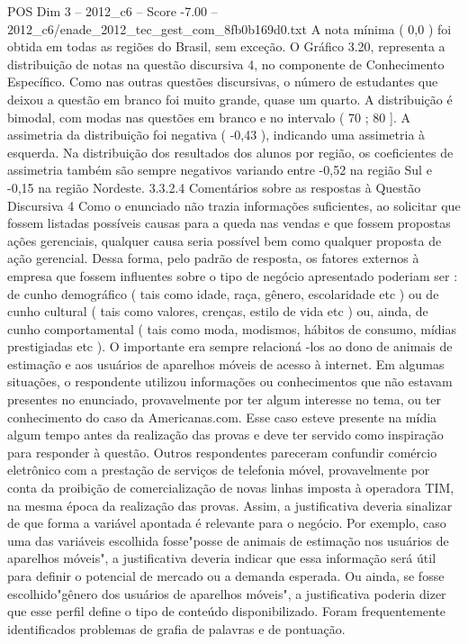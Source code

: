 \begin{textsample}{POS Dim 3 – 2012\_c6 – Score -7.00 – 2012\_c6/enade\_2012\_tec\_gest\_com\_8fb0b169d0.txt}
A nota mínima ( 0,0 ) foi obtida em todas as regiões do Brasil, sem exceção.
O Gráfico 3.20, representa a distribuição de notas na questão discursiva 4, no componente de Conhecimento Específico.
Como nas outras questões discursivas, o número de estudantes que deixou a questão em branco foi muito grande, quase um quarto.
A distribuição é bimodal, com modas nas questões em branco e no intervalo ( 70 ; 80 ].
A assimetria da distribuição foi negativa ( -0,43 ), indicando uma assimetria à esquerda.
Na distribuição dos resultados dos alunos por região, os coeficientes de assimetria também são sempre negativos variando entre -0,52 na região Sul e -0,15 na região Nordeste. 3.3.2.4 Comentários sobre as respostas à Questão Discursiva 4 Como o enunciado não trazia informações suficientes, ao solicitar que fossem listadas possíveis causas para a queda nas vendas e que fossem propostas ações gerenciais, qualquer causa seria possível bem como qualquer proposta de ação gerencial.
Dessa forma, pelo padrão de resposta, os fatores externos à empresa que fossem influentes sobre o tipo de negócio apresentado poderiam ser : de cunho demográfico ( tais como idade, raça, gênero, escolaridade etc ) ou de cunho cultural ( tais como valores, crenças, estilo de vida etc ) ou, ainda, de cunho comportamental ( tais como moda, modismos, hábitos de consumo, mídias prestigiadas etc ).
O importante era sempre relacioná -los ao dono de animais de estimação e aos usuários de aparelhos móveis de acesso à internet.
Em algumas situações, o respondente utilizou informações ou conhecimentos que não estavam presentes no enunciado, provavelmente por ter algum interesse no tema, ou ter conhecimento do caso da Americanas.com.
Esse caso esteve presente na mídia algum tempo antes da realização das provas e deve ter servido como inspiração para responder à questão.
Outros respondentes pareceram confundir comércio eletrônico com a prestação de serviços de telefonia móvel, provavelmente por conta da proibição de comercialização de novas linhas imposta à operadora TIM, na mesma época da realização das provas.
Assim, a justificativa deveria sinalizar de que forma a variável apontada é relevante para o negócio.
Por exemplo, caso uma das variáveis escolhida fosse"posse de animais de estimação nos usuários de aparelhos móveis", a justificativa deveria indicar que essa informação será útil para definir o potencial de mercado ou a demanda esperada.
Ou ainda, se fosse escolhido"gênero dos usuários de aparelhos móveis", a justificativa poderia dizer que esse perfil define o tipo de conteúdo disponibilizado.
Foram frequentemente identificados problemas de grafia de palavras e de pontuação.

\end{textsample}
